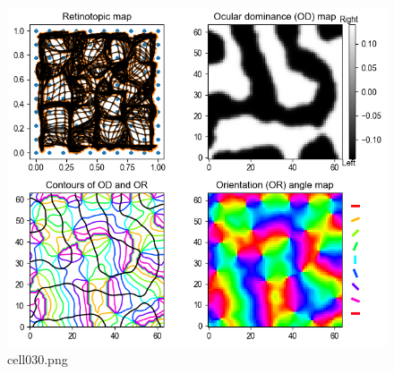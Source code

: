 \begin{figure}[ht]
	\centering
	\includegraphics[scale=0.8, max width=\linewidth]{./fig/local-learning-rule/self-organizing-map/cell030.png}
	\caption{cell030.png}
	\label{cell030.png}
\end{figure}